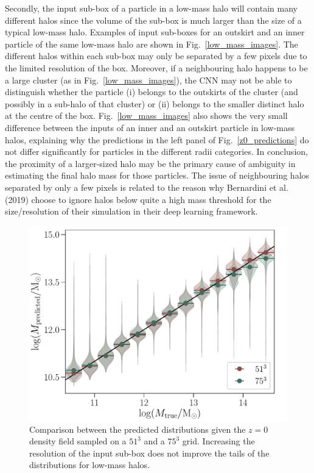 \documentclass[11pt]{article}
\begin{document}
Secondly, the input sub-box of a particle in a low-mass halo will contain many different halos since the volume of the sub-box is much larger than the size of a typical low-mass halo. Examples of input sub-boxes for an outskirt and an inner particle of the same low-mass halo are shown in Fig.~\ref{low_mass_images}. The different halos within each sub-box may only be separated by a few pixels due to the limited resolution of the box. Moreover, if a neighbouring halo happens to be a large cluster (as in Fig.~\ref{low_mass_images}), the CNN may not be able to distinguish whether the particle (i) belongs to the outskirts of the cluster (and possibly in a sub-halo of that cluster) or (ii) belongs to the smaller distinct halo at the centre of the box. Fig.~\ref{low_mass_images} also shows the very small difference between the inputs of an inner and an outskirt particle in low-mass halos, explaining why the predictions in the left panel of Fig.~\ref{z0_predictions} do not differ significantly for particles in the different radii categories. In conclusion, the proximity of a larger-sized halo may be the primary cause of ambiguity in estimating the final halo mass for those particles. The issue of neighbouring halos separated by only a few pixels is related to the reason why Bernardini et al. (2019) choose to ignore halos below quite a high mass threshold for the size/resolution of their simulation in their deep learning framework.

\begin{figure}
\centering
\includegraphics[width=0.65\columnwidth]{z0/res75/res_51_75.pdf}
\caption{Comparison between the predicted distributions given the $z=0$ density field sampled on a $51^3$ and a $75^3$ grid. Increasing the resolution of the input sub-box does not improve the tails of the distributions for low-mass halos.}
\label{75_predictions}
\end{figure}
\end{document}
